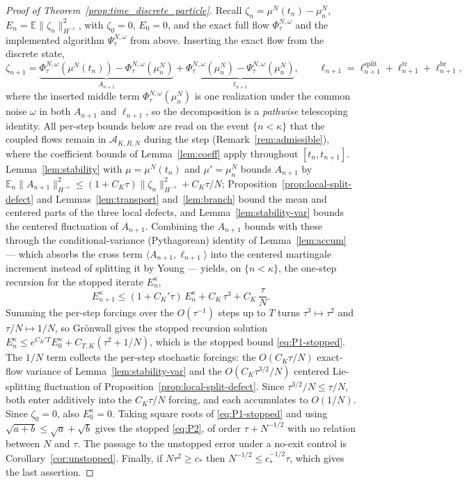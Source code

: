 \documentclass[a4paper,fleqn]{cas-sc}
\theoremstyle{definition}
\theoremstyle{remark}
\begin{document}
\begin{proof}[Proof of Theorem~\ref{prop:time_discrete_particle}]
Recall $\zeta_n=\mu^N(t_n)-\mu^N_n$, $E_n=\mathbb E\|\zeta_n\|_{H^{-s}}^2$, with
$\zeta_0=0$, $E_0=0$, and the exact full flow $\Phi^{N,\omega}_\tau$ and the
implemented algorithm $\Psi^{N,\omega}_\tau$ from above. Inserting the exact flow
from the discrete state,
\[
\zeta_{n+1}
=\underbrace{\Phi^{N,\omega}_\tau(\mu^N(t_n))-\Phi^{N,\omega}_\tau(\mu^N_n)}_{A_{n+1}}
+\underbrace{\Phi^{N,\omega}_\tau(\mu^N_n)-\Psi^{N,\omega}_\tau(\mu^N_n)}_{\ell_{n+1}},
\qquad
\ell_{n+1}=\ell^{\mathrm{split}}_{n+1}+\ell^{\mathrm{tr}}_{n+1}+\ell^{\mathrm{br}}_{n+1},
\]
where the inserted middle term $\Phi^{N,\omega}_\tau(\mu^N_n)$ is one realization under
the common noise $\omega$ in both $A_{n+1}$ and $\ell_{n+1}$, so the decomposition is a
\emph{pathwise} telescoping identity. All per-step bounds below are read on the event $\{n<\kappa\}$
that the coupled flows remain in $\mathcal A_{K,R,N}$ during the step (Remark~\ref{rem:admissible}),
where the coefficient bounds of Lemma~\ref{lem:coeff} apply throughout $[t_n,t_{n+1}]$. Lemma~\ref{lem:stability}
with $\mu=\mu^N(t_n)$ and $\mu'=\mu^N_n$ bounds $A_{n+1}$ by
$\mathbb E_n\|A_{n+1}\|_{H^{-s}}^2\le(1+C_K\tau)\|\zeta_n\|_{H^{-s}}^2+C_K\tau/N$;
Proposition~\ref{prop:local-split-defect} and Lemmas~\ref{lem:transport} and~\ref{lem:branch} bound the mean
and centered parts of the three local defects, and Lemma~\ref{lem:stability-var}
bounds the centered fluctuation of $A_{n+1}$. Combining the $A_{n+1}$ bounds with
these through the conditional-variance (Pythagorean) identity of
Lemma~\ref{lem:accum} --- which absorbs the cross term
$\langle A_{n+1},\ell_{n+1}\rangle$ into the centered martingale increment instead of
splitting it by Young --- yields, on $\{n<\kappa\}$, the one-step recursion for the stopped iterate
$E_n^\kappa$,
\[
E_{n+1}^\kappa\le(1+C_K'\tau)\,E_n^\kappa+C_K\,\tau^3+C_K\,\frac{\tau}{N}.
\]
Summing the per-step forcings over the $O(\tau^{-1})$ steps up to $T$ turns
$\tau^3\mapsto\tau^2$ and $\tau/N\mapsto1/N$, so Gr\"onwall gives the
stopped recursion solution
$E_n^\kappa\le e^{C_K'T}E_0^\kappa+C_{T,K}(\tau^2+1/N)$, which is the stopped bound
\eqref{eq:P1-stopped}. The $1/N$ term
collects the per-step stochastic forcings: the $O(C_K\tau/N)$ exact-flow
variance of Lemma~\ref{lem:stability-var} and the $O(C_K\tau^{3/2}/N)$ centered
Lie-splitting fluctuation of Proposition~\ref{prop:local-split-defect}. Since
$\tau^{3/2}/N\le\tau/N$, both enter additively into the $C_K\tau/N$ forcing, and
each accumulates to $O(1/N)$. Since $\zeta_0=0$, also $E_0^\kappa=0$. Taking square roots of
\eqref{eq:P1-stopped} and using
$\sqrt{a+b}\le\sqrt a+\sqrt b$ gives the stopped \eqref{eq:P2},
of order $\tau+N^{-1/2}$ with no relation
between $N$ and $\tau$. The passage to the unstopped error under a no-exit control is
Corollary~\ref{cor:unstopped}. Finally, if $N\tau^{2}\ge c_*$
then $N^{-1/2}\le c_*^{-1/2}\tau$, which gives the last assertion.
\end{proof}
\end{document}
